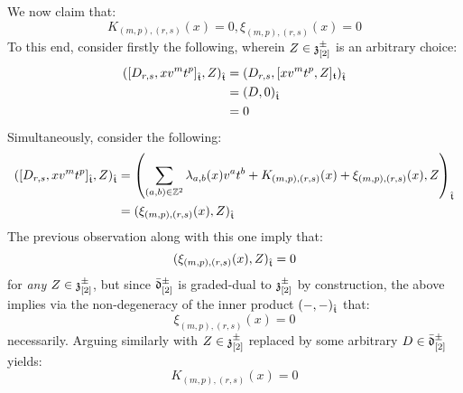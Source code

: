 \begin{remark}
\begin{itemize}
                    We now claim that:
                        $$K_{(m, p), (r, s)}(x) = 0, \xi_{(m, p), (r, s)}(x) = 0$$
                    To this end, consider firstly the following, wherein $Z \in \mathfrak{z}_{[2]}^{\pm}$ is an arbitrary choice:
                        $$
                            \begin{aligned}
                                ( [D_{r, s}, x v^m t^p]_{\hat{\mathfrak{t}}}, Z )_{\hat{\mathfrak{t}}} & = ( D_{r, s}, [x v^m t^p, Z]_{\mathfrak{t}} )_{\hat{\mathfrak{t}}}
                                \\
                                & = (D, 0)_{\hat{\mathfrak{t}}}
                                \\
                                & = 0
                            \end{aligned}
                        $$
                    Simultaneously, consider the following:
                        $$
                            \begin{aligned}
                                ( [D_{r, s}, x v^m t^p]_{\hat{\mathfrak{t}}}, Z )_{\hat{\mathfrak{t}}} & = \left( \sum_{(a, b) \in \mathbb{Z}^2} \lambda_{a, b}(x) v^a t^b + K_{(m, p), (r, s)}(x) + \xi_{(m, p), (r, s)}(x), Z \right)_{\hat{\mathfrak{t}}}
                                \\
                                & = ( \xi_{(m, p), (r, s)}(x), Z )_{\hat{\mathfrak{t}}}
                            \end{aligned}
                        $$
                    The previous observation along with this one imply that:
                        $$( \xi_{(m, p), (r, s)}(x), Z )_{\hat{\mathfrak{t}}} = 0$$
                    for \textit{any} $Z \in \mathfrak{z}_{[2]}^{\pm}$, but since $\bar{\mathfrak{d}}_{[2]}^{\pm}$ is graded-dual to $\mathfrak{z}_{[2]}^{\pm}$ by construction, the above implies via the non-degeneracy of the inner product $(-, -)_{\hat{\mathfrak{t}}}$ that:
                        $$\xi_{(m, p), (r, s)}(x) = 0$$
                    necessarily. Arguing similarly with $Z \in \mathfrak{z}_{[2]}^{\pm}$ replaced by some arbitrary $D \in \bar{\mathfrak{d}}_{[2]}^{\pm}$ yields:
                        $$K_{(m, p), (r, s)}(x) = 0$$


\end{itemize}
\end{remark}
